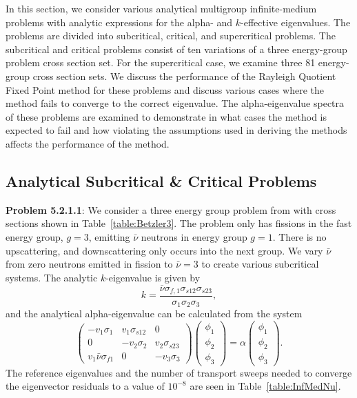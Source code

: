 In this section, we consider various analytical multigroup infinite-medium problems with analytic expressions for the alpha- and $k$-effective eigenvalues. The problems are divided into subcritical, critical, and supercritical problems. The subcritical and critical problems consist of ten variations of a three energy-group problem cross section set. For the supercritical case, we examine three 81 energy-group cross section sets. We discuss the performance of the Rayleigh Quotient Fixed Point method for these problems and discuss various cases where the method fails to converge to the correct eigenvalue. The alpha-eigenvalue spectra of these problems are examined to demonstrate in what cases the method is expected to fail and how violating the assumptions used in deriving the methods affects the performance of the method.

\subsection{Analytical Subcritical \& Critical Problems}

\textbf{Problem 5.2.1.1}: We consider a three energy group problem from \cite{Betzler2014Alpha} with cross sections shown in Table~\ref{table:Betzler3}. The problem only has fissions in the fast energy group, $g = 3$, emitting $\bar{\nu}$ neutrons in energy group $g = 1$. There is no upscattering, and downscattering only occurs into the next group. We vary $\bar{\nu}$ from zero neutrons emitted in fission to $\bar{\nu} = 3$ to create various subcritical systems. The analytic $k$-eigenvalue is given by
\begin{equation}
	k = \frac{\bar{\nu} \sigma_{f,1} \sigma_{s12} \sigma_{s23}}{\sigma_{1} \sigma_{2} \sigma_{3}},
\end{equation}
and the analytical alpha-eigenvalue can be calculated from the system
\begin{equation}
	\begin{pmatrix}
		-v_{1} \sigma_{1} & v_{1} \sigma_{s12} & 0 \\
		0 & -v_{2} \sigma_{2} & v_{2} \sigma_{s23} \\
		v_{1} \bar{\nu} \sigma_{f1} & 0 & -v_{3} \sigma_{3}
	\end{pmatrix}
	\begin{pmatrix}
		\phi_{1} \\ \phi_{2} \\ \phi_{3}
	\end{pmatrix} = 
	\alpha
	\begin{pmatrix}
		\phi_{1} \\ \phi_{2} \\ \phi_{3}
	\end{pmatrix}.
\end{equation}
The reference eigenvalues and the number of transport sweeps needed to converge the eigenvector residuals to a value of $10^{-8}$ are seen in Table~\ref{table:InfMedNu}. 

